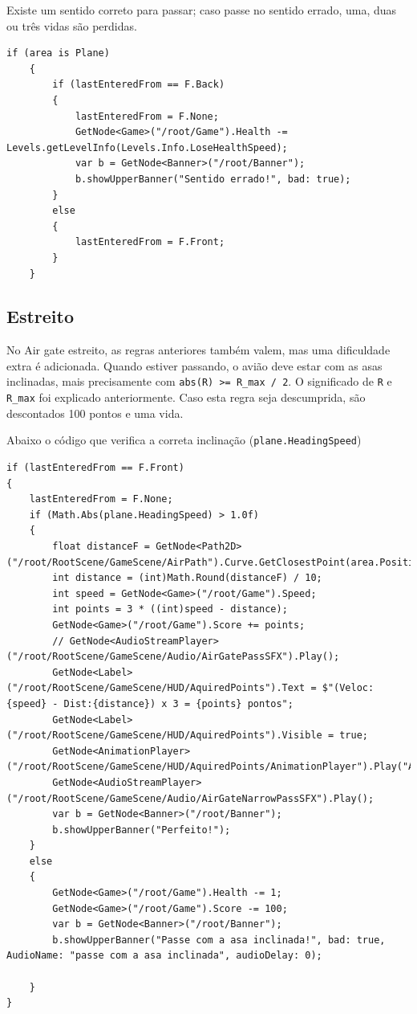 Existe um sentido correto para passar; caso passe no sentido errado, uma, duas ou três vidas são perdidas.

\begin{lstlisting}
if (area is Plane)
    {
        if (lastEnteredFrom == F.Back) 
        {
            lastEnteredFrom = F.None;
            GetNode<Game>("/root/Game").Health -= Levels.getLevelInfo(Levels.Info.LoseHealthSpeed);
            var b = GetNode<Banner>("/root/Banner");
            b.showUpperBanner("Sentido errado!", bad: true);
        }
        else 
        {
            lastEnteredFrom = F.Front;
        }
    }
\end{lstlisting}

\subsection*{Estreito}
No Air gate estreito, as regras anteriores também valem, mas uma dificuldade extra é adicionada. Quando estiver passando, o avião deve estar com as asas inclinadas, mais precisamente com \texttt{abs(R) >= R\_max / 2}. O significado de \texttt{R} e \texttt{R\_max} foi explicado anteriormente. 
Caso esta regra seja descumprida, são descontados 100 pontos e uma vida.

Abaixo o código que verifica a correta inclinação (\texttt{plane.HeadingSpeed})

\begin{lstlisting}
if (lastEnteredFrom == F.Front) 
{
    lastEnteredFrom = F.None;
    if (Math.Abs(plane.HeadingSpeed) > 1.0f)
    {
        float distanceF = GetNode<Path2D>("/root/RootScene/GameScene/AirPath").Curve.GetClosestPoint(area.Position).DistanceSquaredTo(area.Position);
        int distance = (int)Math.Round(distanceF) / 10;
        int speed = GetNode<Game>("/root/Game").Speed;
        int points = 3 * ((int)speed - distance);
        GetNode<Game>("/root/Game").Score += points;
        // GetNode<AudioStreamPlayer>("/root/RootScene/GameScene/Audio/AirGatePassSFX").Play();
        GetNode<Label>("/root/RootScene/GameScene/HUD/AquiredPoints").Text = $"(Veloc:{speed} - Dist:{distance}) x 3 = {points} pontos";
        GetNode<Label>("/root/RootScene/GameScene/HUD/AquiredPoints").Visible = true;
        GetNode<AnimationPlayer>("/root/RootScene/GameScene/HUD/AquiredPoints/AnimationPlayer").Play("AppearAndDisappear");
        GetNode<AudioStreamPlayer>("/root/RootScene/GameScene/Audio/AirGateNarrowPassSFX").Play();
        var b = GetNode<Banner>("/root/Banner");
        b.showUpperBanner("Perfeito!");
    }
    else
    {
        GetNode<Game>("/root/Game").Health -= 1;
        GetNode<Game>("/root/Game").Score -= 100;
        var b = GetNode<Banner>("/root/Banner");
        b.showUpperBanner("Passe com a asa inclinada!", bad: true, AudioName: "passe com a asa inclinada", audioDelay: 0);
        
    }
}
\end{lstlisting}

